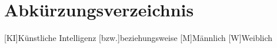 
\chapter*{Abkürzungsverzeichnis}
%	
\begin{doublespace}
    
\begin{acronym}[YTMMM]
\setlength{\itemsep}{-\parsep}

[KI]{Künstliche Intelligenz}
[bzw.]{beziehungsweise}
[M]{Männlich}
[W]{Weiblich}
\end{acronym}
    
\end{doublespace}